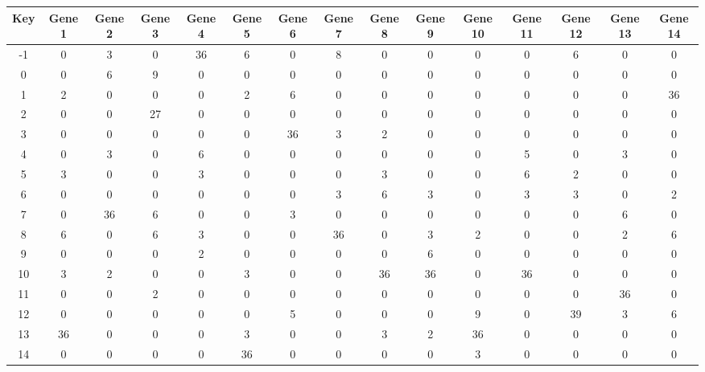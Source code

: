 \begin{tabular}{|c|c|c|c|c|c|c|c|c|c|c|c|c|c|c|}
\hline
Key & Gene 1 & Gene 2 & Gene 3 & Gene 4 & Gene 5 & Gene 6 & Gene 7 & Gene 8 & Gene 9 & Gene 10 & Gene 11 & Gene 12 & Gene 13 & Gene 14 \\
\hline
-1 & 0 & 3 & 0 & 36 & 6 & 0 & 8 & 0 & 0 & 0 & 0 & 6 & 0 & 0 \\
0 & 0 & 6 & 9 & 0 & 0 & 0 & 0 & 0 & 0 & 0 & 0 & 0 & 0 & 0 \\
1 & 2 & 0 & 0 & 0 & 2 & 6 & 0 & 0 & 0 & 0 & 0 & 0 & 0 & 36 \\
2 & 0 & 0 & 27 & 0 & 0 & 0 & 0 & 0 & 0 & 0 & 0 & 0 & 0 & 0 \\
3 & 0 & 0 & 0 & 0 & 0 & 36 & 3 & 2 & 0 & 0 & 0 & 0 & 0 & 0 \\
4 & 0 & 3 & 0 & 6 & 0 & 0 & 0 & 0 & 0 & 0 & 5 & 0 & 3 & 0 \\
5 & 3 & 0 & 0 & 3 & 0 & 0 & 0 & 3 & 0 & 0 & 6 & 2 & 0 & 0 \\
6 & 0 & 0 & 0 & 0 & 0 & 0 & 3 & 6 & 3 & 0 & 3 & 3 & 0 & 2 \\
7 & 0 & 36 & 6 & 0 & 0 & 3 & 0 & 0 & 0 & 0 & 0 & 0 & 6 & 0 \\
8 & 6 & 0 & 6 & 3 & 0 & 0 & 36 & 0 & 3 & 2 & 0 & 0 & 2 & 6 \\
9 & 0 & 0 & 0 & 2 & 0 & 0 & 0 & 0 & 6 & 0 & 0 & 0 & 0 & 0 \\
10 & 3 & 2 & 0 & 0 & 3 & 0 & 0 & 36 & 36 & 0 & 36 & 0 & 0 & 0 \\
11 & 0 & 0 & 2 & 0 & 0 & 0 & 0 & 0 & 0 & 0 & 0 & 0 & 36 & 0 \\
12 & 0 & 0 & 0 & 0 & 0 & 5 & 0 & 0 & 0 & 9 & 0 & 39 & 3 & 6 \\
13 & 36 & 0 & 0 & 0 & 3 & 0 & 0 & 3 & 2 & 36 & 0 & 0 & 0 & 0 \\
14 & 0 & 0 & 0 & 0 & 36 & 0 & 0 & 0 & 0 & 3 & 0 & 0 & 0 & 0 \\
\hline
\end{tabular}